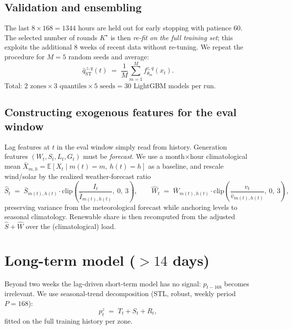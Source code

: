 \documentclass[11pt,a4paper]{article}
\begin{document}
\subsection{Validation and ensembling}

The last $8 \times 168 = 1344$ hours are held out for early stopping
with patience $60$. The selected number of rounds $K^\star$ is then
\emph{re-fit on the full training set}; this exploits the additional
$8$ weeks of recent data without re-tuning. We repeat the procedure
for $M = 5$ random seeds and average:
\begin{equation}
  \hat{q}^{\,z,q}_{\mathrm{ST}}(t)
  \;=\; \frac{1}{M}\sum_{m=1}^{M} f_{\theta_m}^{z,q}(x_t).
  \label{eq:ensemble}
\end{equation}
Total: $2 \text{ zones} \times 3 \text{ quantiles} \times 5 \text{ seeds} = 30$
LightGBM models per run.

\subsection{Constructing exogenous features for the eval window}

Lag features at $t$ in the eval window simply read from history.
Generation features $(W_t, S_t, L_t, G_t)$ must be \emph{forecast}.
We use a month$\times$hour climatological mean
$\bar{X}_{m,h} = \mathbb{E}[X_t \mid m(t)=m,\ h(t)=h]$ as a baseline,
and rescale wind/solar by the realized weather-forecast ratio
\begin{equation}
  \hat{S}_t \;=\; \bar{S}_{m(t),h(t)} \cdot
  \mathrm{clip}\!\left(\frac{I_t}{\bar{I}_{m(t),h(t)}},\ 0,\ 3\right),
  \qquad
  \hat{W}_t \;=\; \bar{W}_{m(t),h(t)} \cdot
  \mathrm{clip}\!\left(\frac{v_t}{\bar{v}_{m(t),h(t)}},\ 0,\ 3\right),
\end{equation}
preserving variance from the meteorological forecast while anchoring
levels to seasonal climatology. Renewable share is then recomputed
from the adjusted $\hat{S} + \hat{W}$ over the (climatological) load.

\section{Long-term model ($> 14$ days)}
\label{sec:long}

Beyond two weeks the lag-driven short-term model has no signal:
$p_{t-168}$ becomes irrelevant. We use seasonal-trend decomposition
(STL, robust, weekly period $P = 168$):
\begin{equation}
  p_t^z \;=\; T_t + S_t + R_t,
\end{equation}
fitted on the full training history per zone.
\end{document}
